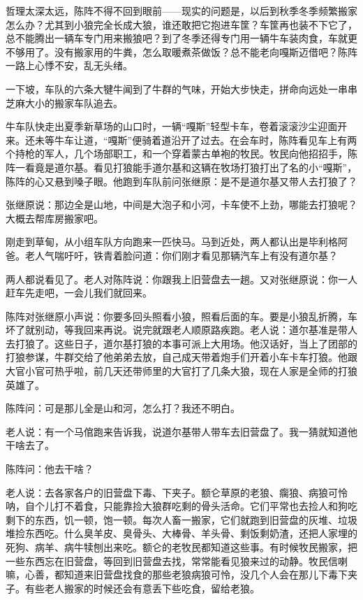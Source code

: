 \par 哲理太深太远，陈阵不得不回到眼前——现实的问题是，以后到秋季冬季频繁搬家怎么办？尤其到小狼完全长成大狼，谁还敢把它抱进车筐？车筐再也装不下它了，总不能腾出一辆车专门用来搬狼吧？到了冬季还得专门用一辆牛车装肉食，车就更不够用了。没有搬家用的牛粪，怎么取暖煮茶做饭？总不能老向嘎斯迈借吧？陈阵一路上心悸不安，乱无头绪。
\par 一下坡，车队的六条大犍牛闻到了牛群的气味，开始大步快走，拼命向远处一串串芝麻大小的搬家车队追去。
\par 
\par 牛车队快走出夏季新草场的山口时，一辆“嘎斯”轻型卡车，卷着滚滚沙尘迎面开来。还未等牛车让道，“嘎斯”便骑着道沿开了过去。在会车时，陈阵看见车上有两个持枪的军人，几个场部职工，和一个穿着蒙古单袍的牧民。牧民向他招招手，陈阵一看竟是道尔基。看见打狼能手道尔基和这辆在牧场打狼打出了名的小“嘎斯”，陈阵的心又悬到嗓子眼。他跑到车队前问张继原：是不是道尔基又带人去打狼了？
\par 张继原说：那边全是山地，中间是大泡子和小河，卡车使不上劲，哪能去打狼呢？大概去帮库房搬家吧。
\par 刚走到草甸，从小组车队方向跑来一匹快马。马到近处，两人都认出是毕利格阿爸。老人气喘吁吁，铁青着脸问道：你们刚才看见那辆汽车上有没有道尔基？
\par 两人都说看见了。老人对陈阵说：你跟我上旧营盘去一趟。又对张继原说：你一人赶车先走吧，一会儿我们就回来。
\par 陈阵对张继原小声说：你要多回头照看小狼，照看后面的车。要是小狼乱折腾，车坏了就别动，等我回来再说。说完就跟老人顺原路疾跑。老人说：道尔基准是带人去打狼了。这些日子，道尔基打狼的本事可派上大用场。他汉话好，当上了团部的打狼参谋，牛群交给了他弟弟去放，自己成天带着炮手们开着小车卡车打狼。他跟大官小官可热乎啦，前几天还带师里的大官打了几条大狼，现在人家是全师的打狼英雄了。
\par 陈阵问：可是那儿全是山和河，怎么打？我还不明白。
\par 老人说：有一个马倌跑来告诉我，说道尔基带人带车去旧营盘了。我一猜就知道他干啥去了。
\par 陈阵问：他去干啥？
\par 老人说：去各家各户的旧营盘下毒、下夹子。额仑草原的老狼、瘸狼、病狼可怜呐，自个儿打不着食，只能靠捡大狼群吃剩的骨头活命。它们平常也去捡人和狗吃剩下的东西，饥一顿，饱一顿。每次人畜一搬家，它们就跑到旧营盘的灰堆、垃圾堆捡东西吃。什么臭羊皮、臭骨头、大棒骨、羊头骨、剩饭剩奶渣，还把人家埋的死狗、病羊、病牛犊刨出来吃。额仑的老牧民都知道这些事。有时候牧民搬家，把一些东西忘在旧营盘，等回到旧营盘去找，常常能看见狼来过的动静。牧民信喇嘛，心善，都知道来旧营盘找食的那些老狼病狼可怜，没几个人会在那儿下毒下夹子。有些老人搬家的时候还会有意丢下些吃食，留给老狼。
